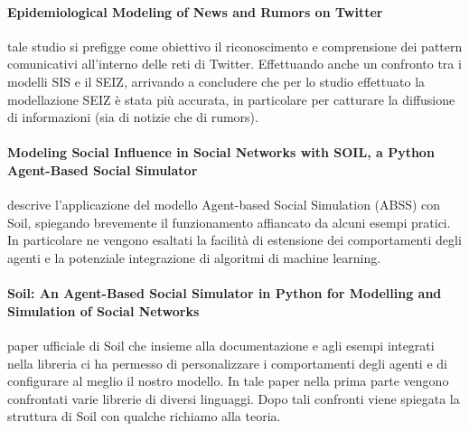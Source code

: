    \paragraph{Epidemiological Modeling of News and Rumors on Twitter\cite{Paper4_Epidemiological}} tale studio si prefigge come obiettivo il riconoscimento e comprensione dei pattern comunicativi all’interno delle reti di Twitter. Effettuando anche un confronto tra i modelli SIS e il SEIZ, arrivando a concludere che per lo studio effettuato la modellazione SEIZ è stata più accurata, in particolare per catturare la diffusione di informazioni (sia di notizie che di rumors).
    
    \paragraph{Modeling Social Influence in Social Networks with SOIL, a Python Agent-Based Social Simulator\cite{Paper5_Modeling}}
    descrive l'applicazione del modello Agent-based Social Simulation (ABSS) con Soil, spiegando brevemente il funzionamento affiancato da alcuni esempi pratici. In particolare ne vengono esaltati la facilità di estensione dei comportamenti degli agenti e la potenziale integrazione di algoritmi di machine learning.
    
    \paragraph{Soil: An Agent-Based Social Simulator in Python for Modelling and Simulation of Social Networks\cite{Paper6_Soil}}
    paper ufficiale di Soil che insieme alla documentazione e agli esempi integrati nella libreria ci ha permesso di personalizzare i comportamenti degli agenti e di configurare al meglio il nostro modello. In tale paper nella prima parte vengono confrontati varie librerie di diversi linguaggi. Dopo tali confronti viene spiegata la struttura di Soil con qualche richiamo alla teoria.
